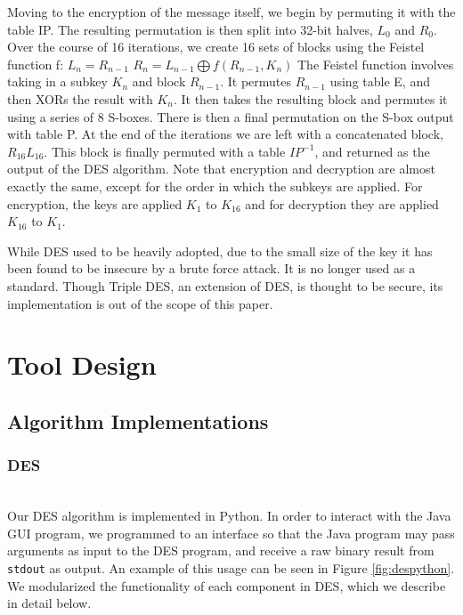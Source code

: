 \documentclass[acmlarge]{acmart}
\begin{document}
Moving to the encryption of the message itself, we begin by permuting it with the table IP. The resulting permutation is then split into 32-bit halves, $L_{0}$ and $R_{0}$. Over the course of 16 iterations, we create 16  sets of blocks using the Feistel function f:
$L_{n} = R_{n-1}$
$R_{n} = L_{n-1} \bigoplus f(R_{n-1}, K_{n})$ 
	The Feistel function involves taking in a subkey $K_{n}$ and block $R_{n - 1}$. It permutes $R_{n - 1}$ using table E, and then XORs the result with $K_{n}$. It then takes the resulting block and permutes it using a series of 8 S-boxes. There is then a final permutation on the S-box output with table P. At the end of the iterations we are left with a concatenated block, $R_{16}L_{16}$. This block is finally permuted with a table $IP^{-1}$, and returned as the output of the DES algorithm. Note that encryption and decryption are almost exactly the same, except for the order in which the subkeys are applied. For encryption, the keys are applied $K_{1}$ to $K_{16}$ and for decryption they are applied $K_{16}$ to $K_{1}$.

While DES used to be heavily adopted, due to the small size of the key it has been found to be insecure by a brute force attack. It is no longer used as a standard. Though Triple DES, an extension of DES, is thought to be secure, its implementation is out of the scope of this paper. 


\section{Tool Design} \label{sec:impl}
\subsection{Algorithm Implementations} \label{sec:algorithms}
\subsubsection{DES}
\hspace*{\fill} \\ %
Our DES algorithm is implemented in Python. In order to interact with the Java GUI program, we programmed to an interface so that the Java program may pass arguments as input to the DES program, and receive a raw binary result from \texttt{stdout} as output. An example of this usage can be seen in Figure \ref{fig:despython}. We modularized the functionality of each component in DES, which we describe in detail below.
\end{document}
